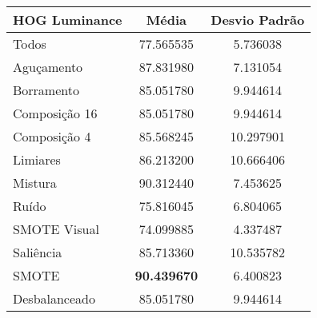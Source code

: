 

\begin{table}[!htbp]
\centering
\caption{}
\label{tab:resultados:x:melhor}
\begin{tabular}{|l|c|c|}
\hline
\textbf{HOG Luminance} & \textbf{Média}     & \textbf{Desvio Padrão} \\ \hline
   Todos        &  77.565535  &  5.736038  \\ \hline
  Aguçamento    &  87.831980  &  7.131054  \\ \hline
  Borramento    &  85.051780  &  9.944614  \\ \hline
  Composição 16 &  85.051780  &  9.944614  \\ \hline
  Composição 4  &  85.568245 &  10.297901  \\ \hline
  Limiares      &  86.213200 &  10.666406  \\ \hline
  Mistura       &  90.312440  &  7.453625  \\ \hline
  Ruído         &  75.816045  &  6.804065  \\ \hline
  SMOTE Visual  &  74.099885  &  4.337487  \\ \hline
  Saliência     &  85.713360 &  10.535782  \\ \hline
 SMOTE          &  \textbf{90.439670}  &  6.400823  \\ \hline
Desbalanceado   &  85.051780  &  9.944614  \\ \hline
\end{tabular}
\end{table}

